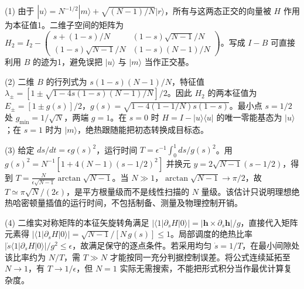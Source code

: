 (1) 由于 \(|u\rangle=N^{-1/2}|m\rangle+\sqrt{(N-1)/N}|r\rangle\)，所有与这两态正交的向量被 \(H\) 作用为本征值1。二维子空间的矩阵为 \(\boxed{H_2=I_2-\begin{pmatrix}s+(1-s)/N&(1-s)\sqrt{N-1}/N\\(1-s)\sqrt{N-1}/N&(1-s)(N-1)/N\end{pmatrix}}\)。写成 \(I-B\) 可直接利用 \(B\) 的迹为1，避免误把 \(|u\rangle\) 与 \(|m\rangle\) 当作正交基。

(2) 二维 \(B\) 的行列式为 \(s(1-s)(N-1)/N\)，特征值 \(\lambda_\pm=[1\pm\sqrt{1-4s(1-s)(N-1)/N}]/2\)。因此 \(H_2\) 的两本征值为 \(E_\pm=[1\pm g(s)]/2\)，\(\boxed{g(s)=\sqrt{1-4(1-1/N)s(1-s)}}\)。最小点 \(s=1/2\) 处 \(g_{\min}=1/\sqrt N\)，两端 \(g=1\)。在 \(s=0\) 时 \(H=I-|u\rangle\langle u|\) 的唯一零能基态为 \(|u\rangle\)；在 \(s=1\) 时为 \(|m\rangle\)，绝热跟随能把初态转换成目标态。

(3) 给定 \(ds/dt=\epsilon g(s)^2\)，运行时间 \(T=\epsilon^{-1}\int_0^1 ds/g(s)^2\)。用 \(g(s)^2=N^{-1}[1+4(N-1)(s-1/2)^2]\) 并换元 \(y=2\sqrt{N-1}(s-1/2)\)，得到 \(\boxed{T=\frac{N}{\epsilon\sqrt{N-1}}\arctan\sqrt{N-1}}\)。当 \(N\gg1\)，\(\arctan\sqrt{N-1}\to\pi/2\)，故 \(T\simeq\pi\sqrt N/(2\epsilon)\)，是平方根量级而不是线性扫描的 \(N\) 量级。该估计只说明理想绝热哈密顿量插值的运行时间，不包括制备、测量及物理控制开销。

(4) 二维实对称矩阵的本征矢旋转角满足 \(|\langle1|\partial_sH|0\rangle|=|\boldsymbol h\times\partial_s\boldsymbol h|/g\)，直接代入矩阵元素得 \(\boxed{|\langle1|\partial_sH|0\rangle|=\sqrt{N-1}/[N\,g(s)]\le1}\)。局部调度的绝热比率 \(|\dot s\langle1|\partial_sH|0\rangle|/g^2\le\epsilon\)，故满足保守的逐点条件。若采用均匀 \(\dot s=1/T\)，在最小间隙处该比率约为 \(N/T\)，需 \(T\gg N\) 才能按同一充分判据控制误差。将公式连续延拓至 \(N\to1\)，有 \(T\to1/\epsilon\)，但 \(N=1\) 实际无需搜索，不能把形式积分当作最优计算复杂度。
